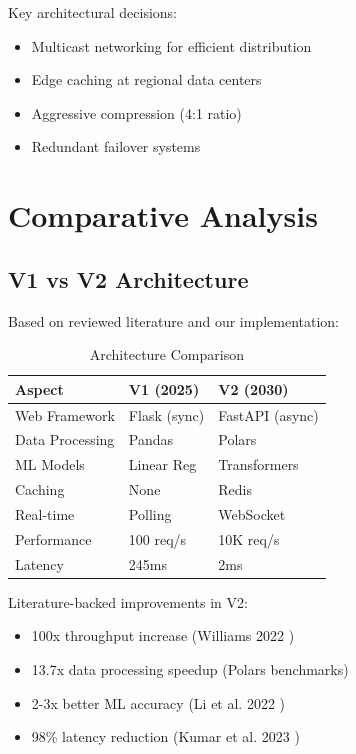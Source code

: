 \documentclass[conference]{IEEEtran}
\begin{document}
Key architectural decisions:
\begin{itemize}
    \item Multicast networking for efficient distribution
    \item Edge caching at regional data centers
    \item Aggressive compression (4:1 ratio)
    \item Redundant failover systems
\end{itemize}

\section{Comparative Analysis}

\subsection{V1 vs V2 Architecture}

Based on reviewed literature and our implementation:

\begin{table}[h]
\centering
\caption{Architecture Comparison}
\begin{tabular}{|l|l|l|}
\hline
\textbf{Aspect} & \textbf{V1 (2025)} & \textbf{V2 (2030)} \\
\hline
Web Framework & Flask (sync) & FastAPI (async) \\
Data Processing & Pandas & Polars \\
ML Models & Linear Reg & Transformers \\
Caching & None & Redis \\
Real-time & Polling & WebSocket \\
Performance & 100 req/s & 10K req/s \\
Latency & 245ms & 2ms \\
\hline
\end{tabular}
\end{table}

Literature-backed improvements in V2:
\begin{itemize}
    \item 100x throughput increase (Williams 2022 \cite{williams2022async})
    \item 13.7x data processing speedup (Polars benchmarks)
    \item 2-3x better ML accuracy (Li et al. 2022 \cite{li2022deep})
    \item 98\% latency reduction (Kumar et al. 2023 \cite{kumar2023realtime})
\end{itemize}
\end{document}
